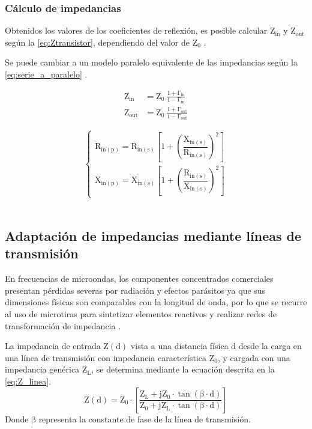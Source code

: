 \documentclass{article}
\begin{document}
\subsubsection{Cálculo de impedancias} \label{section:sec_2.7.3}
Obtenidos los valores de los coeficientes de reflexión, es posible calcular $\mathrm{Z_{in}}$ y $\mathrm{Z_{out}}$ según la \autoref{eq:Ztransistor}, dependiendo del valor de $\mathrm{Z_0}$ \cite[p.~59]{pozar_microwave}. 

Se puede cambiar a un modelo paralelo equivalente de las impedancias según la \autoref{eq:serie_a_paralelo} \cite[p.~125]{gonzalez_amplifiers}.

\begin{equation}
    \begin{aligned}
        \mathrm{Z_{in}}  & \mathrm{= Z_0 \ \frac{1 + \Gamma_{in}}{1 - \Gamma_{in}}} \\
        \mathrm{Z_{out}} & \mathrm{= Z_0 \ \frac{1 + \Gamma_{out}}{1 - \Gamma_{out}}}
    \end{aligned}
    \label{eq:Ztransistor}
\end{equation}

\begin{equation}
    \label{eq:serie_a_paralelo}
    \begin{cases} 
        \mathrm{R_{in(p)} = R_{in(s)} \left[1 + \left( \dfrac{X_{in(s)}}{R_{in(s)}} \right)^2 \right]} \\[15pt]
        \mathrm{X_{in(p)} = X_{in(s)} \left[ 1 + \left( \dfrac{R_{in(s)}}{X_{in(s)}} \right)^2 \right]}
    \end{cases}
\end{equation}
\\



\subsection{Adaptación de impedancias mediante líneas de transmisión} \label{section:sec_2.8}
En frecuencias de microondas, los componentes concentrados comerciales presentan pérdidas severas por radiación y efectos parásitos ya que sus dimensiones físicas son comparables con la longitud de onda, por lo que se recurre al uso de microtiras para sintetizar elementos reactivos y realizar redes de transformación de impedancia \cite[págs.~59--62]{pozar_microwave}.

La impedancia de entrada $\mathrm{Z(d)}$ vista a una distancia física $\mathrm{d}$ desde la carga en una línea de transmisión con impedancia característica $\mathrm{Z_0}$, y cargada con una impedancia genérica $\mathrm{Z_L}$, se determina mediante la ecuación descrita en la \autoref{eq:Z_linea}.
\begin{equation}
    \mathrm{Z(d) = Z_{0} \cdot \left[ \frac{Z_{L} + j Z_{0} \cdot \tan(\beta \cdot d)}{Z_{0} + j Z_{L} \cdot \tan(\beta \cdot d)} \right]}
    \label{eq:Z_linea}
\end{equation}
Donde $\mathrm{\beta}$ representa la constante de fase de la línea de transmisión.
\end{document}
